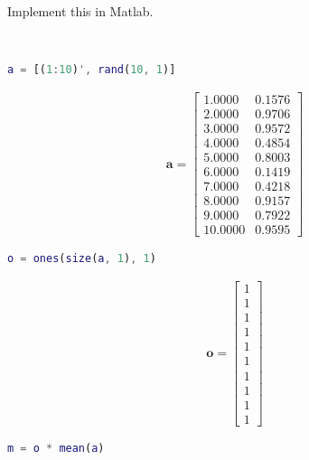 Implement this in Matlab.

\begin{solution} \
    \begin{lstlisting}[language=Matlab]
a = [(1:10)', rand(10, 1)]
    \end{lstlisting}
    
    \begin{align*}
        \boldsymbol{a} = \begin{bmatrix}
            1.0000 & 0.1576 \\
            2.0000 & 0.9706 \\
            3.0000 & 0.9572 \\
            4.0000 & 0.4854 \\
            5.0000 & 0.8003 \\
            6.0000 & 0.1419 \\
            7.0000 & 0.4218 \\
            8.0000 & 0.9157 \\
            9.0000 & 0.7922 \\
           10.0000 & 0.9595
        \end{bmatrix}
    \end{align*}
    
    \begin{lstlisting}[language=Matlab]
o = ones(size(a, 1), 1)
    \end{lstlisting}
    
    \begin{align*}
        \boldsymbol{o} = \begin{bmatrix}
            1 \\ 1 \\ 1 \\ 1 \\ 1 \\ 1 \\ 1 \\ 1 \\ 1 \\ 1
        \end{bmatrix}
    \end{align*}
    
    \begin{lstlisting}[language=Matlab]
m = o * mean(a)
    \end{lstlisting}
    

\end{solution}
